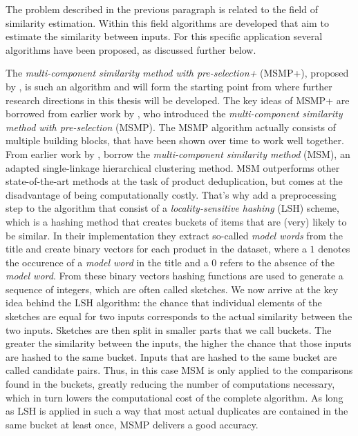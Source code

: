The problem described in the previous paragraph is related to the field of similarity estimation. Within this field algorithms are  developed that aim to estimate the similarity between inputs. For this specific application several algorithms have been proposed, as discussed further below.

The \textit{multi-component similarity method with pre-selection+} (MSMP+),  proposed by \cite{HartveldKMNPFS18}, is such an algorithm and will form the starting point from where further research directions in this thesis will be developed. The key ideas of MSMP+ are borrowed from earlier work by \cite{DamGKNVF16}, who introduced the \textit{multi-component similarity method with pre-selection} (MSMP). The MSMP algorithm actually consists of multiple building blocks, that have been shown over time to work well together. From earlier work by \cite{BezuBRVVF15}, \cite{DamGKNVF16} borrow the \textit{multi-component similarity method} (MSM), an adapted single-linkage hierarchical clustering method. MSM outperforms other state-of-the-art methods at the task of product deduplication, but comes at the disadvantage of being computationally costly. That's why \cite{DamGKNVF16} add a preprocessing step to the algorithm that consist of a \textit{locality-sensitive hashing} (LSH) scheme, which is a hashing method that creates buckets of items that are (very) likely to be similar. In their implementation they extract so-called \textit{model words} from the title and create binary vectors for each product in the dataset, where a $1$ denotes the occurence of a \textit{model word} in the title and a $0$ refers to the absence of the \textit{model word}. From these binary vectors hashing functions are used to generate a sequence of integers, which are often called sketches. We now arrive at the key idea behind the LSH algorithm: the chance that individual elements of the sketches are equal for two inputs corresponds to the actual similarity between the two inputs. Sketches are then split in smaller parts that we call buckets. The greater the similarity between the inputs, the higher the chance that those inputs are hashed to the same bucket. Inputs that are hashed to the same bucket are called candidate pairs. Thus, in this case MSM is only applied to the comparisons found in the buckets, greatly reducing the number of computations necessary, which in turn lowers the computational cost of the complete algorithm. As long as LSH is applied in such a way that most actual duplicates are contained in the same bucket at least once, MSMP delivers a good accuracy. 


